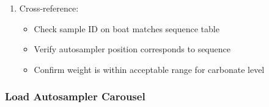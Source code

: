 \documentclass[11pt,a4paper]{article}\usepackage[]{graphicx}\usepackage[]{xcolor}
\begin{document}
\begin{enumerate}[noitemsep]
\begin{itemize}
        \item Avoid touching boat with bare hands (use powder-free gloves or tweezers)
    \end{itemize}
    \item Cross-reference:
    \begin{itemize}
        \item Check sample ID on boat matches sequence table
        \item Verify autosampler position corresponds to sequence
        \item Confirm weight is within acceptable range for carbonate level
    \end{itemize}
\end{enumerate}

\subsubsection{Load Autosampler Carousel}
\end{document}
